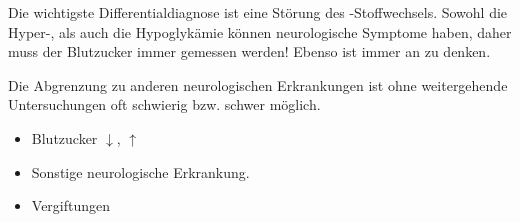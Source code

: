 {
Die wichtigste Differentialdiagnose ist eine Störung des
-Stoffwechsels. Sowohl die Hyper-, als auch
die Hypoglykämie können neurologische Symptome haben, daher
muss der Blutzucker immer gemessen werden! Ebenso ist immer
an  zu denken.

Die Abgrenzung zu anderen neurologischen Erkrankungen ist
ohne weitergehende Untersuchungen oft schwierig bzw. schwer
möglich. 
}{
\begin{itemize}
  \item Blutzucker ${\downarrow}$, ${\uparrow}$
  \item Sonstige neurologische Erkrankung.
  \item Vergiftungen
\end{itemize}

}{}{}{}

